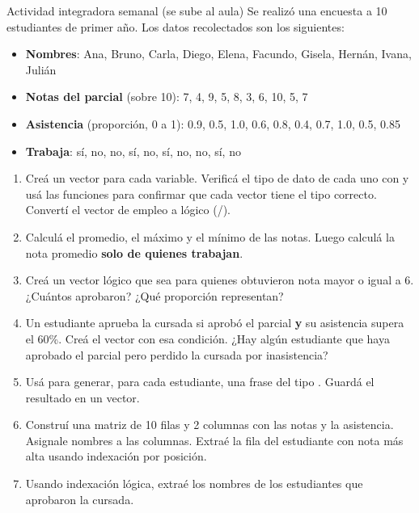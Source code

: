 \documentclass[8pt]{beamer}
\begin{document}
	\begin{frame}[fragile]{Actividad integradora semanal (se sube al aula)}
		Se realizó una encuesta a 10 estudiantes de primer año. Los datos recolectados son los siguientes:

		\begin{itemize}
			\item \textbf{Nombres}: Ana, Bruno, Carla, Diego, Elena, Facundo, Gisela, Hernán, Ivana, Julián
			\item \textbf{Notas del parcial} (sobre 10): 7, 4, 9, 5, 8, 3, 6, 10, 5, 7
			\item \textbf{Asistencia} (proporción, 0 a 1): 0.9, 0.5, 1.0, 0.6, 0.8, 0.4, 0.7, 1.0, 0.5, 0.85
			\item \textbf{Trabaja}: sí, no, no, sí, no, sí, no, no, sí, no
		\end{itemize}

		\begin{enumerate}
			\item Creá un vector para cada variable. Verificá el tipo de dato de cada uno con  y usá las funciones  para confirmar que cada vector tiene el tipo correcto. Convertí el vector de empleo a lógico (/).
			\item Calculá el promedio, el máximo y el mínimo de las notas. Luego calculá la nota promedio \textbf{solo de quienes trabajan}.
			\item Creá un vector lógico  que sea  para quienes obtuvieron nota mayor o igual a 6. ¿Cuántos aprobaron? ¿Qué proporción representan?
			\item Un estudiante aprueba la cursada si aprobó el parcial \textbf{y} su asistencia supera el 60\%. Creá el vector  con esa condición. ¿Hay algún estudiante que haya aprobado el parcial pero perdido la cursada por inasistencia?
			\item Usá  para generar, para cada estudiante, una frase del tipo . Guardá el resultado en un vector.
			\item Construí una matriz de 10 filas y 2 columnas con las notas y la asistencia. Asignale nombres a las columnas. Extraé la fila del estudiante con nota más alta usando indexación por posición.
			\item Usando indexación lógica, extraé los nombres de los estudiantes que aprobaron la cursada.
		\end{enumerate}
	\end{frame}
\end{document}
